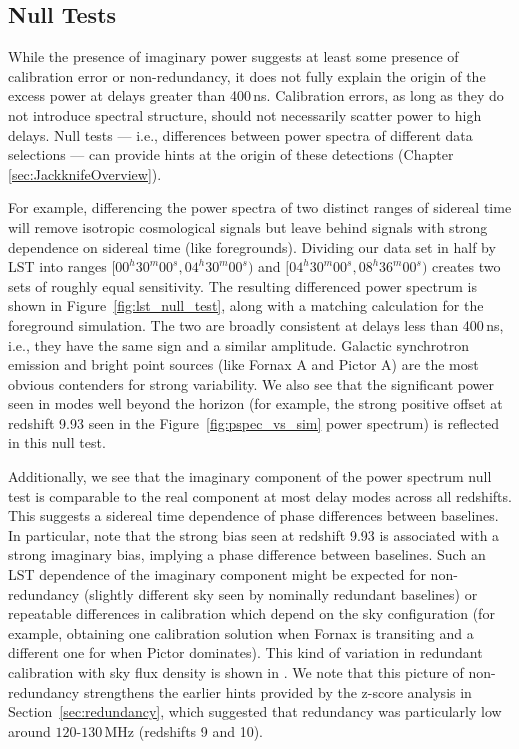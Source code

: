 \subsection{Null Tests}\label{sec:nulls}

While the presence of imaginary power suggests at least some presence of calibration error or non-redundancy, it does not fully explain the origin of the excess power at delays greater than 400\,ns. Calibration errors, as long as they do not introduce
spectral structure, should not necessarily scatter power to high delays. Null tests --- i.e., differences between
power spectra of different data selections --- can provide hints at the origin of these detections (Chapter \ref{sec:JackknifeOverview}).

For example, differencing the power spectra of two distinct ranges of sidereal time will remove
isotropic cosmological signals but leave behind signals with strong dependence on sidereal time (like foregrounds).
Dividing our data set in half by LST into ranges $ [00^{h}30^{m}00^{s}, 04^{h}30^{m}00^{s}) $
and $ [04^{h}30^{m}00^{s}, 08^{h}36^{m}00^{s}) $ creates two sets of roughly equal sensitivity.
The resulting differenced power spectrum is shown in Figure~\ref{fig:lst_null_test}, along with a matching calculation for the foreground simulation.
The two are broadly consistent at
delays less than 400\,ns, i.e., they have the same sign and a
similar amplitude. Galactic synchrotron emission and bright point sources (like Fornax A
and Pictor A) are the most obvious contenders for strong variability. We also see that the significant power seen in modes well beyond the horizon (for example, the strong positive offset at redshift 9.93 seen in the Figure~\ref{fig:pspec_vs_sim} power spectrum) is reflected in this null test.

Additionally, we see that the imaginary component of the power spectrum null test is comparable to the real component at most delay modes across all redshifts. 
This suggests a sidereal time dependence of phase differences between baselines. In particular, note that the strong bias seen at redshift 9.93 is associated with a strong imaginary bias, implying a phase difference between baselines. Such an LST dependence of the imaginary component might be expected for non-redundancy (slightly different sky seen by nominally redundant baselines) or repeatable differences in calibration which depend on the sky configuration (for example, obtaining one calibration solution when Fornax is transiting and a different one for when Pictor dominates). This kind of variation in redundant calibration with sky flux density is shown in \citet{joseph_et_al2018}. We note that this picture of non-redundancy strengthens the earlier hints provided by the z-score analysis in Section~\ref{sec:redundancy}, which suggested that redundancy was particularly low around $120$-$130$\,MHz (redshifts 9 and 10).

